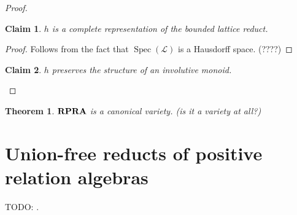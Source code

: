 \documentclass[a4paper]{article}
\theoremstyle{defin}
\theoremstyle{theorem}
\newtheorem{theorem}{Theorem}
\theoremstyle{claim}
\newtheorem{claim}{Claim}
\theoremstyle{prop}
\theoremstyle{lemma}
\theoremstyle{fact}
\theoremstyle{ex}
\theoremstyle{col}
\begin{document}
\begin{proof}
\begin{claim}
$h$ is a complete representation of the bounded lattice reduct.
\end{claim}

\begin{proof}
Follows from the fact that $\operatorname{Spec}(\mathcal{L})$ is a Hausdorff space. (????)
\end{proof}

\begin{claim}
$h$ preserves the structure of an involutive monoid.
\end{claim}
\end{proof}

\begin{theorem}
${\bf RPRA}$ is a canonical variety. (is it a variety at all?)
\end{theorem}

\section{Union-free reducts of positive relation algebras}

TODO: \cite{bezhanishvili2011priestley}.



\end{document}
